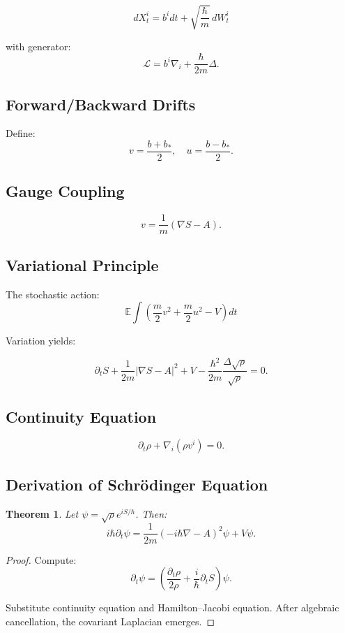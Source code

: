 \documentclass[11pt]{article}
\newtheorem{theorem}{Theorem}[section]
\begin{document}
\[
dX_t^i = b^i dt + \sqrt{\frac{\hbar}{m}}\, dW_t^i
\]

with generator:
\[
\mathcal{L} = b^i \nabla_i + \frac{\hbar}{2m}\Delta.
\]

\subsection{Forward/Backward Drifts}

Define:
\[
v = \frac{b + b_*}{2}, \quad u = \frac{b - b_*}{2}.
\]

\subsection{Gauge Coupling}

\[
v = \frac{1}{m}(\nabla S - A).
\]

\subsection{Variational Principle}

The stochastic action:
\[
\mathbb{E} \int \left( \frac{m}{2} v^2 + \frac{m}{2} u^2 - V \right) dt
\]

Variation yields:

\[
\partial_t S + \frac{1}{2m}|\nabla S - A|^2 + V
- \frac{\hbar^2}{2m}\frac{\Delta \sqrt{\rho}}{\sqrt{\rho}}=0.
\]

\subsection{Continuity Equation}

\[
\partial_t \rho + \nabla_i(\rho v^i)=0.
\]

\subsection{Derivation of Schr\"odinger Equation}

\begin{theorem}
Let $\psi = \sqrt{\rho} e^{iS/\hbar}$. Then:
\[
i\hbar \partial_t \psi =
\frac{1}{2m}(-i\hbar\nabla - A)^2 \psi + V\psi.
\]
\end{theorem}

\begin{proof}
Compute:
\[
\partial_t \psi = \left(\frac{\partial_t \rho}{2\rho} + \frac{i}{\hbar}\partial_t S \right)\psi.
\]

Substitute continuity equation and Hamilton--Jacobi equation. After algebraic cancellation, the covariant Laplacian emerges.
\end{proof}
\end{document}
